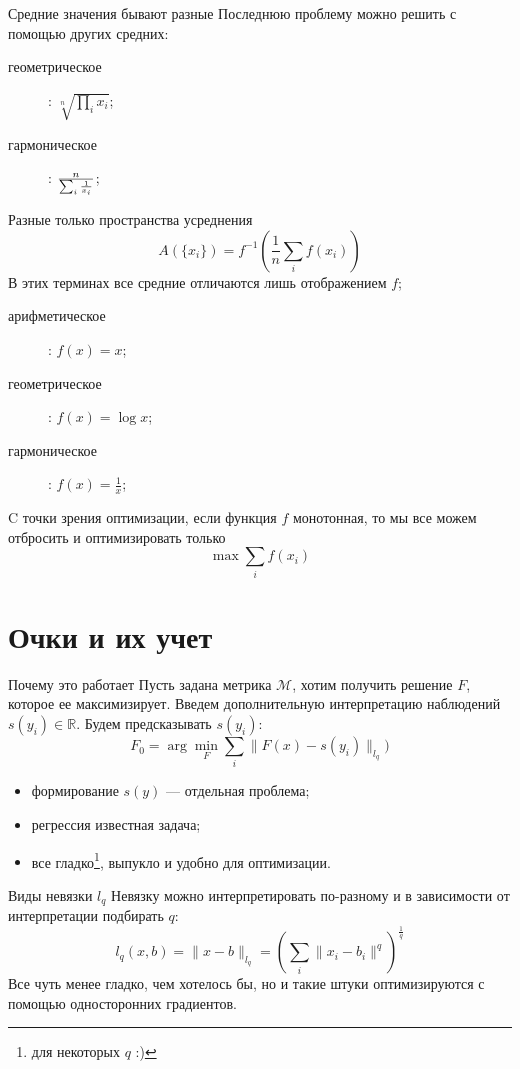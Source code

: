 \documentclass[14pt, fleqn, xcolor={dvipsnames, table}]{beamer}
\begin{document}
\begin{frame}{Средние значения бывают разные}
Последнюю проблему можно решить с помощью других средних:

\begin{description}
  \item[геометрическое]: $\sqrt[n]{\prod_i x_i}$; 
  \item[гармоническое]: $n\over \sum_i \frac{1}{x_i}$;
\end{description}
\end{frame}

\begin{frame}{Разные только пространства усреднения}
$$
A(\{x_i\}) = f^{-1}\left(\frac{1}{n} \sum_i f(x_i)\right)
$$
В этих терминах все средние отличаются лишь отображением $f$;
\begin{description}
  \item[арифметическое]: $f(x) = x$; 
  \item[геометрическое]: $f(x) = \log x$; 
  \item[гармоническое]: $f(x) = \frac{1}{x}$; 
\end{description}
C точки зрения оптимизации, если функция $f$ монотонная, то мы все можем отбросить и оптимизировать только
$$
\max \sum_i f(x_i)
$$
\end{frame}

\section{Очки и их учет}

\begin{frame}{Почему это работает}
Пусть задана метрика $\mathcal{M}$, хотим получить решение $F$, которое ее максимизирует. Введем дополнительную интерпретацию наблюдений $s(y_i) \in \mathbb{R}$. Будем предсказывать $s(y_i)$:
$$
F_0 = \arg\min_F \sum_i \|F(x) - s(y_i)\|_{l_q})
$$
\begin{itemize}
  \item формирование $s(y)$ --- отдельная проблема;
  \item регрессия известная задача;
  \item все гладко\footnote{для некоторых $q$ :)}, выпукло и удобно для оптимизации.
\end{itemize}
\end{frame}

\begin{frame}{Виды невязки $l_q$}
Невязку можно интерпретировать по-разному и в зависимости от интерпретации подбирать $q$:
$$
l_q(x,b) = \|x - b\|_{l_q} = \left(\sum_i\|x_i - b_i\|^q\right)^\frac{1}{q}
$$
Все чуть менее гладко, чем хотелось бы, но и такие штуки оптимизируются с помощью односторонних градиентов.
\end{frame}
\end{document}
